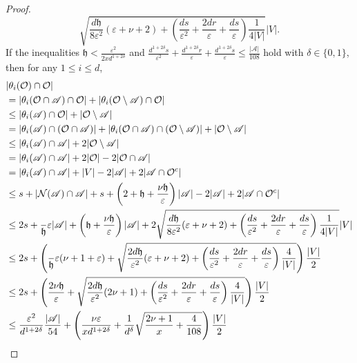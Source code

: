 \documentclass[10pt]{article}
\theoremstyle{definition}
\newcommand{\calN}{\ensuremath{\mathcal{N}}}
\newcommand{\calO}{\ensuremath{\mathcal{O}}}
\newcommand{\scrA}{\ensuremath{\mathscr{A}}}
\newcommand{\tth}{\ensuremath{\mathfrak{h}}}
\begin{document}
\begin{proof}
$$\sqrt{\frac{d\tth}{8\varepsilon^2} (\varepsilon + \nu + 2) 
+
\left(\frac{ds}{\varepsilon^2} + \frac{2dr}\varepsilon + \frac{ds}{\varepsilon}
\right)
\frac{1}{4|V|}
}|V|.$$
If the inequalities $\tth<  \frac{\varepsilon^{2}}{2x d^{1 + 2\delta}}$ and $ \frac{ d^{1 + 2\delta} s}{\varepsilon^2 }
+ \frac{ d^{1 + 2\delta} r}{\varepsilon } + \frac{d^{1 + 2\delta} s}{\varepsilon}\leq \frac{|\scrA|}{108}$ hold with $\delta \in \{0, 1\}$, then for any $1\leq i \leq d$, 
\begin{align*}
&|\theta_i(\calO)\cap \calO |\\
& = |\theta_i(\calO\cap \scrA) \cap \calO| + |\theta_i(\calO\setminus \scrA) \cap \calO|\\
& \leq |\theta_i(\scrA) \cap \calO| + |\calO\setminus \scrA|\\
& = |\theta_i(\scrA) \cap (\calO\cap \scrA) | + |\theta_i(\calO\cap \scrA) \cap (\calO\setminus \scrA) | + |\calO\setminus \scrA|\\ 
& \leq |\theta_i(\scrA) \cap \scrA| + 2|\calO\setminus \scrA|\\ 
& = |\theta_i(\scrA) \cap \scrA| + 2|\calO| - 2|\calO\cap \scrA|\\ 
& = |\theta_i(\scrA) \cap \scrA| + |V| - 2|\scrA| + 2|\scrA\cap \calO^c|\\ 
& \leq s +  |\calN(\scrA) \cap \scrA| + s + \left(2 + \tth + \frac{\nu\tth}{\varepsilon}\right)|\scrA|- 2|\scrA| + 2|\scrA\cap \calO^c|\\ 
& \leq 2s + \frac \tth\varepsilon |\scrA| + \left( \tth + \frac{\nu\tth}{\varepsilon}\right)|\scrA| + 2\sqrt{\frac{d\tth}{8\varepsilon^2} (\varepsilon + \nu + 2) 
	+
	\left(\frac{ds}{\varepsilon^2} + \frac{2dr}\varepsilon + \frac{ds}{\varepsilon}
	\right)
	\frac{1}{4|V|}
}|V| \\
& \leq 2s + \left(\frac \tth\varepsilon (\nu+1 + \varepsilon)  + \sqrt{\frac{2d\tth}{\varepsilon^2} (\varepsilon + \nu + 2) 
+\left(\frac{ds}{\varepsilon^2} + \frac{2dr}\varepsilon + \frac{ds}{\varepsilon}
\right)
\frac{4}{|V|}
}\right) \frac{|V|}{2} \\
& \leq 2s + \left(\frac {2\nu\tth}\varepsilon + \sqrt{\frac{2d\tth}{\varepsilon^2} (2\nu + 1) 
+\left(\frac{ds}{\varepsilon^2} + \frac{2dr}\varepsilon + \frac{ds}{\varepsilon}
\right)
\frac{4}{|V|}
}\right) \frac{|V|}{2} \\
& \leq \frac{\varepsilon^2}{d^{1 + 2\delta}} \frac{|\scrA|}{54} + \left(\frac {\nu\varepsilon}{xd^{1 + 2\delta}} + \frac 1 {d^{\delta}}\sqrt{\frac{ 2\nu + 1 }{x}
+
\frac{4}{108}
}\right) \frac{|V|}{2} \\

\end{align*}
\end{proof}
\end{document}
